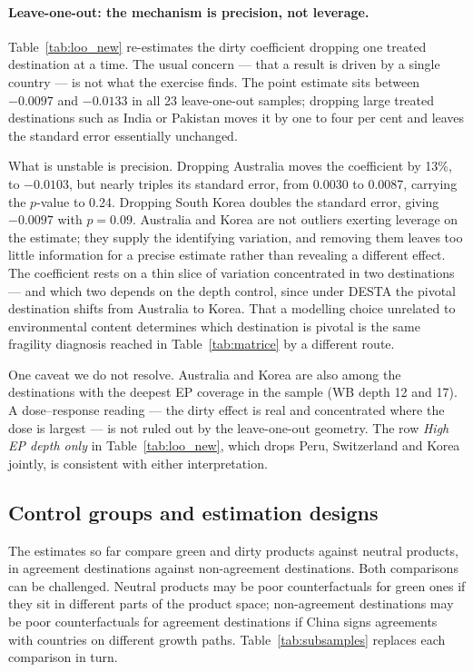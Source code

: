 \documentclass[11pt]{article}
\begin{document}


\paragraph{Leave-one-out: the mechanism is precision, not leverage.} Table~\ref{tab:loo_new}
re-estimates the dirty coefficient dropping one treated destination at a time. The usual concern
--- that a result is driven by a single country --- is not what the exercise finds. The point
estimate sits between $-0.0097$ and $-0.0133$ in all 23 leave-one-out samples; dropping large
treated destinations such as India or Pakistan moves it by one to four per cent and leaves the
standard error essentially unchanged.

What is unstable is precision. Dropping Australia moves the coefficient by 13\%, to $-0.0103$, but
nearly triples its standard error, from 0.0030 to 0.0087, carrying the $p$-value to 0.24. Dropping
South Korea doubles the standard error, giving $-0.0097$ with $p = 0.09$. Australia and Korea are
not outliers exerting leverage on the estimate; they supply the identifying variation, and removing
them leaves too little information for a precise estimate rather than revealing a different effect.
The coefficient rests on a thin slice of variation concentrated in two destinations --- and which
two depends on the depth control, since under DESTA the pivotal destination shifts from Australia
to Korea. That a modelling choice unrelated to environmental content determines which destination is
pivotal is the same fragility diagnosis reached in Table~\ref{tab:matrice} by a different route.

One caveat we do not resolve. Australia and Korea are also among the destinations with the deepest
EP coverage in the sample (WB depth 12 and 17). A dose--response reading --- the dirty effect is
real and concentrated where the dose is largest --- is not ruled out by the leave-one-out geometry.
The row \textit{High EP depth only} in Table~\ref{tab:loo_new}, which drops Peru, Switzerland and
Korea jointly, is consistent with either interpretation.



\FloatBarrier
\subsection{Control groups and estimation designs}\label{sec:subsamples}

The estimates so far compare green and dirty products against neutral products, in agreement
destinations against non-agreement destinations. Both comparisons can be challenged. Neutral
products may be poor counterfactuals for green ones if they sit in different parts of the product
space; non-agreement destinations may be poor counterfactuals for agreement destinations if China
signs agreements with countries on different growth paths. Table~\ref{tab:subsamples} replaces each
comparison in turn.
\end{document}
